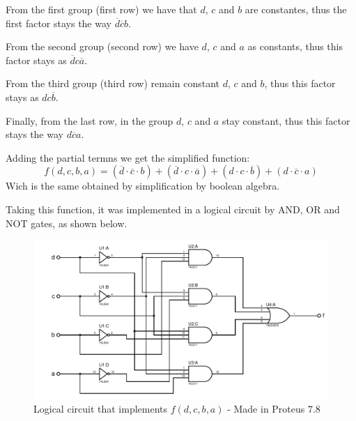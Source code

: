 \begin{centering}
    \begin{Karnaugh}
    \end{Karnaugh}
\par\end{centering}

From the first group (first row) we have that $d$, $c$ and $b$ 
are constantes, thus the first factor stays the way 
$ \overline{d} \overline{c} b$.\par
From the second group (second row) we have $d$, $c$ and $a$ as
constants, thus this factor stays as $ \overline{d} c \overline{a}$.\par
From the third group (third row) remain constant $d$, $c$ and $b$, thus 
this factor stays as $d c \overline{b}$.\par
Finally, from the last row, in the group $d$, $c$ and $a$ stay constant, 
thus this factor stays the way
$d \overline{c} a$.\par
Adding the partial termns we get the simplified function:
\[
    \boxed{f(d,c,b,a)=(\overline{d} \cdot \overline{c} \cdot b)+
    (\overline{d} \cdot c \cdot \overline{a})+
    (d \cdot c \cdot \overline{b})+
    (d \cdot \overline{c} \cdot a)}
\]
Wich is the same obtained by simplification by boolean algebra. \par
Taking this function, it was implemented in a logical circuit
 by AND, OR and NOT gates, as shown below.

\begin{figure}[H]
    \begin{centering}
    \includegraphics[width=1\textwidth]{data/ImplementacionEj2}
    \par\end{centering}
    \caption{Logical circuit that implements $f(d,c,b,a)$ - Made in Proteus 7.8}
\end{figure}

